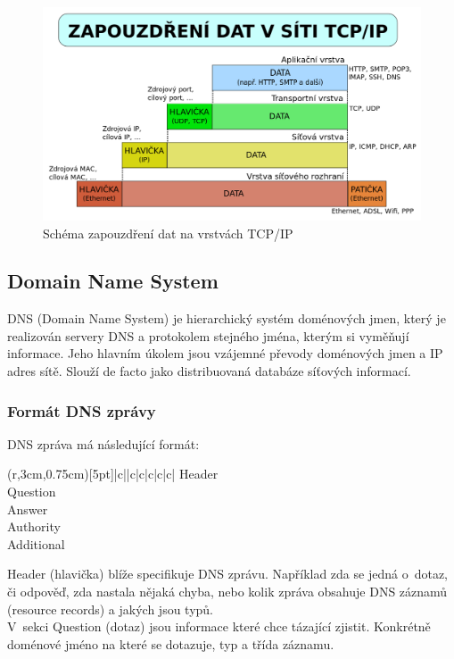 \documentclass[11pt, a4paper, titlepage]{article}
\begin{document}
\begin{figure}[htp]
    \centering
    \includegraphics[width=.55\textwidth]{layers_schema.png}\hfill
    \caption{Schéma zapouzdření dat na vrstvách TCP/IP}
\end{figure}

\subsection{Domain Name System}

DNS (Domain Name System) je hierarchický systém doménových jmen, který je realizován servery DNS a protokolem stejného jména, kterým si vyměňují informace. Jeho hlavním úkolem jsou vzájemné převody doménových jmen a IP adres sítě. Slouží de facto jako distribuovaná databáze síťových informací.

\subsubsection{Formát DNS zprávy}

DNS zpráva má následující formát:

\begin{table}[H]
	\centering
	\begin{TAB}(r,3cm,0.75cm)[5pt]{|c|}{|c|c|c|c|c|}
		Header \\
		Question \\
		Answer \\
		Authority \\
		Additional \\
	\end{TAB}
\end{table}

Header (hlavička) blíže specifikuje DNS zprávu. Například zda se jedná o~dotaz, či odpověď, zda nastala nějaká chyba, nebo kolik zpráva obsahuje DNS záznamů (resource records) a jakých jsou typů. \\

V~sekci Question (dotaz) jsou informace které chce tázající zjistit. Konkrétně doménové jméno na které se dotazuje, typ a třída záznamu. \\
\end{document}
